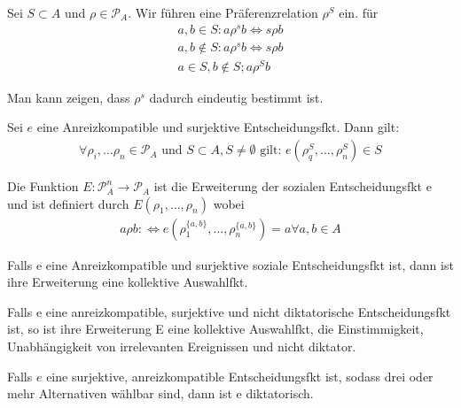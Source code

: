 \begin{defi}
	Sei $S \subset A$ und $\rho \in \mathcal{P}_A$. Wir führen eine Präferenzrelation $\rho^S$ ein. für 
	\begin{align*}
		a,b \in S: a \rho^s b \Leftrightarrow s \rho b \\
		a,b \notin S: a \rho^s b \Leftrightarrow s \rho b \\
		a \in S, b \notin S; a \rho^S b
	\end{align*}
\end{defi}
Man kann zeigen, dass $\rho^s$ dadurch eindeutig bestimmt ist. 

\begin{lem}
	Sei $e$ eine Anreizkompatible und surjektive Entscheidungsfkt. Dann gilt: 
	\begin{align*}
		\forall \rho_i, \dots \rho_n \in \mathcal{P}_A \text{ und } S \subset A, S \neq \emptyset \text{ gilt: } e(\rho_q^S, \dots, \rho_n^S) \in S
	\end{align*}
\end{lem}

\begin{defi}
	Die Funktion $E: \mathcal{P}_A^n \rightarrow \mathcal{P}_A$ ist die Erweiterung der sozialen Entscheidungsfkt e und ist definiert durch $E(\rho_1, \dots, \rho_n)$ wobei 
	\begin{align*}
		a \rho b : \Leftrightarrow e(\rho_1^{\{a,b\}} , \dots, \rho_n^{\{a,b\}})=a \forall a,b \in A
	\end{align*}
\end{defi}

\begin{lem}
	Falls e eine Anreizkompatible und surjektive soziale Entscheidungsfkt ist, dann ist ihre Erweiterung eine kollektive Auswahlfkt. 
\end{lem}

\begin{lem}[Erweiterungslemma]
	Falls e eine anreizkompatible, surjektive und nicht diktatorische Entscheidungsfkt ist, so ist ihre Erweiterung E eine kollektive Auswahlfkt, die Einstimmigkeit, Unabhängigkeit von irrelevanten Ereignissen und nicht diktator.
\end{lem}

\begin{thm}
	Falls $e$ eine surjektive, anreizkompatible Entscheidungsfkt ist, sodass drei oder mehr Alternativen wählbar sind, dann ist e diktatorisch. 
\end{thm}





